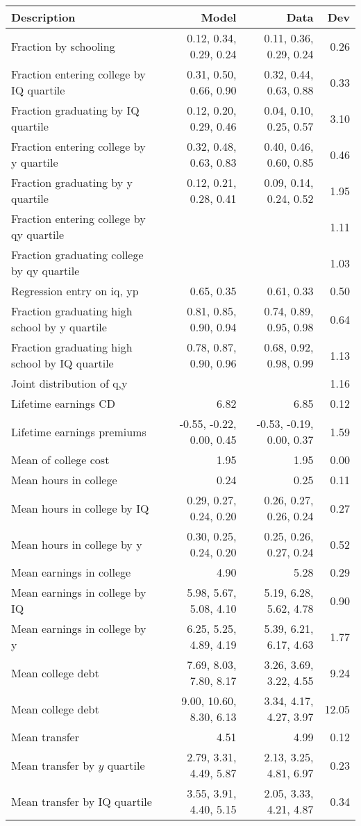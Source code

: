 \begin{tabular}{lrrr}
\hline
Description & Model  & Data  & Dev  \\ 
\hline
Fraction by schooling & 0.12, 0.34, 0.29, 0.24  & 0.11, 0.36, 0.29, 0.24  & 0.26  \\ 
Fraction entering college by IQ quartile & 0.31, 0.50, 0.66, 0.90  & 0.32, 0.44, 0.63, 0.88  & 0.33  \\ 
Fraction graduating by IQ quartile & 0.12, 0.20, 0.29, 0.46  & 0.04, 0.10, 0.25, 0.57  & 3.10  \\ 
Fraction entering college by y quartile & 0.32, 0.48, 0.63, 0.83  & 0.40, 0.46, 0.60, 0.85  & 0.46  \\ 
Fraction graduating by y quartile & 0.12, 0.21, 0.28, 0.41  & 0.09, 0.14, 0.24, 0.52  & 1.95  \\ 
Fraction entering college by qy quartile &   &   & 1.11  \\ 
Fraction graduating college by qy quartile &   &   & 1.03  \\ 
Regression entry on iq, yp & 0.65, 0.35  & 0.61, 0.33  & 0.50  \\ 
Fraction graduating high school by y quartile & 0.81, 0.85, 0.90, 0.94  & 0.74, 0.89, 0.95, 0.98  & 0.64  \\ 
Fraction graduating high school by IQ quartile & 0.78, 0.87, 0.90, 0.96  & 0.68, 0.92, 0.98, 0.99  & 1.13  \\ 
Joint distribution of q,y &   &   & 1.16  \\ 
Lifetime earnings CD & 6.82  & 6.85  & 0.12  \\ 
Lifetime earnings premiums & -0.55, -0.22, 0.00, 0.45  & -0.53, -0.19, 0.00, 0.37  & 1.59  \\ 
Mean of college cost & 1.95  & 1.95  & 0.00  \\ 
Mean hours in college & 0.24  & 0.25  & 0.11  \\ 
Mean hours in college by IQ & 0.29, 0.27, 0.24, 0.20  & 0.26, 0.27, 0.26, 0.24  & 0.27  \\ 
Mean hours in college by y & 0.30, 0.25, 0.24, 0.20  & 0.25, 0.26, 0.27, 0.24  & 0.52  \\ 
Mean earnings in college & 4.90  & 5.28  & 0.29  \\ 
Mean earnings in college by IQ & 5.98, 5.67, 5.08, 4.10  & 5.19, 6.28, 5.62, 4.78  & 0.90  \\ 
Mean earnings in college by y & 6.25, 5.25, 4.89, 4.19  & 5.39, 6.21, 6.17, 4.63  & 1.77  \\ 
Mean college debt & 7.69, 8.03, 7.80, 8.17  & 3.26, 3.69, 3.22, 4.55  & 9.24  \\ 
Mean college debt & 9.00, 10.60, 8.30, 6.13  & 3.34, 4.17, 4.27, 3.97  & 12.05  \\ 
Mean transfer & 4.51  & 4.99  & 0.12  \\ 
Mean transfer by $y$ quartile & 2.79, 3.31, 4.49, 5.87  & 2.13, 3.25, 4.81, 6.97  & 0.23  \\ 
Mean transfer by IQ quartile & 3.55, 3.91, 4.40, 5.15  & 2.05, 3.33, 4.21, 4.87  & 0.34  \\ 
\hline
\end{tabular}%
